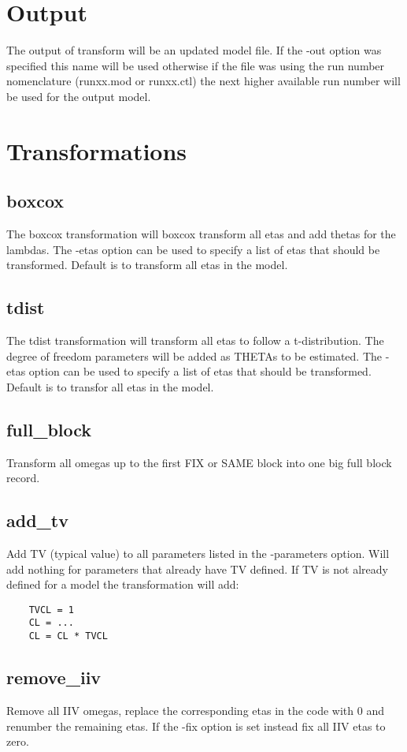 \section{Output}

The output of transform will be an updated model file. If the -out option was specified this name will be used otherwise if the file was using the run number nomenclature (runxx.mod or runxx.ctl) the next higher available run number will be used for the output model.

\section{Transformations}

\subsection{boxcox}
The boxcox transformation will boxcox transform all etas and add thetas for the lambdas. The -etas option can be used to specify a list of etas that should be transformed. Default is to transform all etas in the model.

\subsection{tdist}
The tdist transformation will transform all etas to follow a t-distribution. The degree of freedom parameters will be added as THETAs to be estimated. The -etas option can be used to specify a list of etas that should be transformed. Default is to transfor all etas in the model.

\subsection{full\_block}
Transform all omegas up to the first FIX or SAME block into one big full block record.

\subsection{add\_tv}
Add TV (typical value) to all parameters listed in the -parameters option. Will add nothing for parameters that already have TV defined. If TV is not already defined for a model the transformation will add:
\begin{verbatim}
    TVCL = 1
    CL = ...
    CL = CL * TVCL
\end{verbatim}

\subsection{remove\_iiv}
Remove all IIV omegas, replace the corresponding etas in the code with 0 and renumber the remaining etas. If the -fix option is set instead fix all IIV etas to zero.


